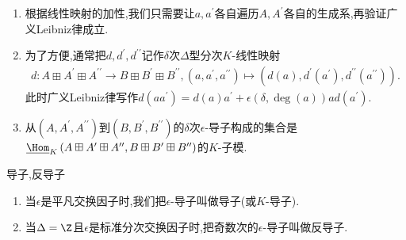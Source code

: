 \begin{remark}{}{}
	\begin{enumerate}
		\item 根据线性映射的加性,我们只需要让$a,a^{\prime}$各自遍历$A,A^{\prime}$各自的生成系,再验证广义Leibniz律成立.
		\item 为了方便,通常把$d,d^{\prime},d^{\prime\prime}$记作$\delta$次$\Delta$型分次$K$-线性映射
		\begin{align*}
			d:A\boxplus A^{\prime}\boxplus A^{\prime\prime}\to B\boxplus B^{\prime}\boxplus B^{\prime\prime},\left(a,a^{\prime},a^{\prime\prime}\right)\mapsto\left(d\left(a\right),d^{\prime}\left(a^{\prime}\right),d^{\prime\prime}\left(a^{\prime\prime}\right)\right).
		\end{align*}
		此时广义Leibniz律写作$d\left(aa^{\prime}\right)=d\left(a\right)a^{\prime}+\epsilon\left(\delta,\deg\left(a\right)\right)ad\left(a^{\prime}\right)$.
		\item 从$\left(A,A^{\prime},A^{\prime\prime}\right)$到$\left(B,B^{\prime},B^{\prime\prime}\right)$的$\delta$次$\epsilon$-导子构成的集合是$\underline{\Hom}_{K}\left(A\boxplus A^{\prime}\boxplus A^{\prime\prime},B\boxplus B^{\prime}\boxplus B^{\prime\prime}\right)$的$K$-子模.
	\end{enumerate}
\end{remark}

\begin{definition}{导子,反导子}{}
	\begin{enumerate}
		\item 当$\epsilon$是平凡交换因子时,我们把$\epsilon$-导子叫做导子(或$K$-导子).
		\item 当$\Delta=\Z$且$\epsilon$是标准分次交换因子时,把奇数次的$\epsilon$-导子叫做反导子.
	\end{enumerate}
\end{definition}

